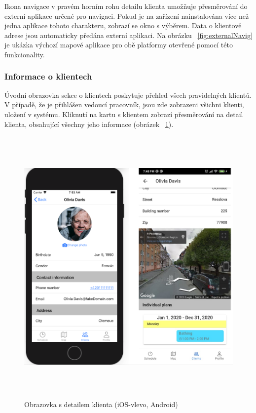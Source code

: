 \documentclass[
  biblatex,
  glossaries,
  index
]{kidiplom}
\begin{document}
Ikona navigace v pravém horním rohu detailu klienta umožňuje přesměrování do externí aplikace určené pro navigaci. Pokud je na zařízení nainstalována více než jedna aplikace tohoto charakteru, zobrazí se okno s výběrem. Data o klientově adrese jsou automaticky předána externí aplikaci. Na obrázku ~\ref{fig:externalNavig} je ukázka výchozí mapové aplikace pro obě platformy otevřené pomocí této funkcionality.

\subsubsection{Informace o klientech}
Úvodní obrazovka sekce o klientech poskytuje přehled všech pravidelných klientů. V případě, že je přihlášen vedoucí pracovník, jsou zde zobrazeni všichni klienti, uložení v systému. Kliknutí na kartu s klientem zobrazí přesměrování na detail klienta, obsahující všechny jeho informace (obrázek ~\ref{fig:clientDetail}).

\begin{figure}[H]
  	\centering
 	 \includegraphics[width=14cm,height=14cm,keepaspectratio]{client_detail}
 	 \caption{Obrazovka s detailem klienta (iOS-vlevo, Android)}
 	 \label{fig:clientDetail}
\end{figure}
\end{document}
